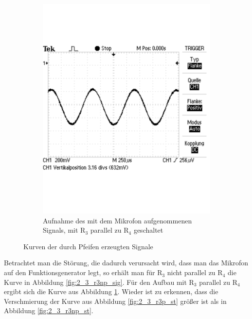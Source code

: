 \documentclass[12pt,a4paper]{article}
\begin{document}
\begin{figure}[H]
\begin{subfigure}[b]{0.48\textwidth}
                \includegraphics[width=\textwidth , scale = 0.4]{2_3_r3p_sig.pdf}
                \caption[Aufnahme des mit dem Mikrofon aufgenommenen Signals, mit R$_3$ parallel zu R$_4$ geschaltet]{Aufnahme des mit dem Mikrofon aufgenommenen Signals, mit R$_3$ parallel zu R$_4$ geschaltet}
  				\label{fig:2_3_r3p_sig}
        \end{subfigure}
        \caption{Kurven der durch Pfeifen erzeugten Signale}
        \label{fig:2_3_sin_vergleich}
\end{figure}



Betrachtet man die Störung, die dadurch verursacht wird, dass man das Mikrofon auf den Funktionsgenerator legt, so erhält man für R$_3$ nicht parallel zu R$_4$ die Kurve in Abbildung \ref{fig:2_3_r3np_sig}. Für den Aufbau mit R$_3$ parallel zu R$_4$ ergibt sich die Kurve aus Abbildung \ref{fig:2_3_r3p_sig}. Wieder ist zu erkennen, dass die Verschmierung der Kurve aus Abbildung \ref{fig:2_3_r3p_st} größer ist als in Abbildung \ref{fig:2_3_r3np_st}.
\end{document}
